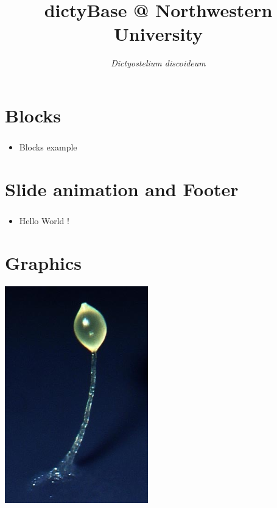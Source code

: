 \documentclass[hyperref={pdfpagelabels=false}, compress]{beamer}
\title{dictyBase @ Northwestern University}
\author{\textit{Dictyostelium discoideum}}
\date
\begin{document}
\frame{\titlepage}

\section[Overview]{}
\frame{\tableofcontents}


\section{Blocks}
\begin{frame}
	\frametitle{}
	
	\begin{block}{}
		\begin{itemize}
			\item Blocks example
		\end{itemize}
	\end{block}
\end{frame}


\section{Slide animation and Footer}
\begin{frame}
	\frametitle{}
	
	\begin{itemize}
		\item<1> Hello World !
	\end{itemize}
	
\let\thefootnote\relax{}
\end{frame}


\section{Graphics}
\begin{frame}
	\begin{center}
		\includegraphics[scale=0.45]{dicty_stalk.png}
	\end{center}
\end{frame}

\end{document}
